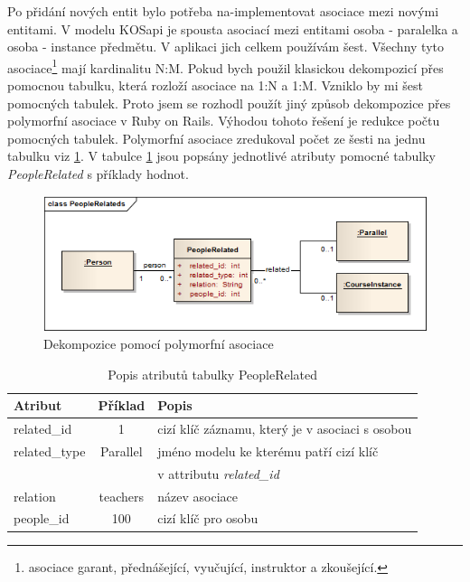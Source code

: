 Po přidání nových entit bylo potřeba na-implementovat asociace mezi novými entitami. V modelu KOSapi je spousta asociací mezi entitami osoba - paralelka a osoba - instance předmětu. V aplikaci jich celkem používám šest. Všechny tyto asociace\footnote{asociace garant, přednášející, vyučující, instruktor a zkoušející.} mají kardinalitu N:M. Pokud bych použil klasickou dekompozicí přes pomocnou tabulku, která rozloží asociace na 1:N a 1:M. Vzniklo by mi šest pomocných tabulek. Proto jsem se rozhodl použít jiný způsob dekompozice přes polymorfní asociace \cite{guide_pa} v Ruby on Rails. Výhodou tohoto řešení je redukce počtu pomocných tabulek. Polymorfní asociace zredukoval počet ze šesti na jednu tabulku viz \ref{fig:polymorfni}. V tabulce \ref{tab:people_related} jsou popsány jednotlivé atributy pomocné tabulky \textit{PeopleRelated} s příklady hodnot.

\begin{figure}[h]
\begin{center}
\includegraphics[width=12cm]{figures/PeopleRelateds}
\caption{Dekompozice pomocí polymorfní asociace}
\label{fig:polymorfni}
\end{center}
\end{figure}

\begin{table}[h]
\begin{center}
\begin{tabular}{|l|c|l|}

\hline
\textbf{Atribut} & \textbf{Příklad} & \textbf{Popis} \\ \hline
related\_id & 1 & cizí klíč záznamu, který je v asociaci s osobou \\\hline
related\_type & Parallel & jméno modelu ke kterému patří cizí klíč \\ & & v attributu \textit{related\_id} \\ \hline
relation & teachers & název asociace \\\hline
people\_id & 100 & cizí klíč pro osobu  \\\hline

\end{tabular}
\caption{Popis atributů tabulky PeopleRelated}
\label{tab:people_related}
\end{center}
\end{table}


